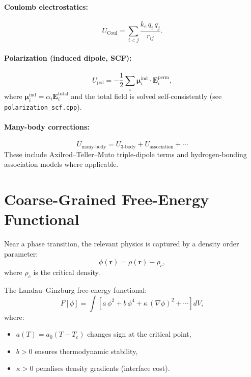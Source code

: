 \documentclass[11pt]{article}
\begin{document}
\paragraph{Coulomb electrostatics:}
\begin{equation}
  U_\mathrm{Coul} = \sum_{i<j} \frac{k_e\,q_i\,q_j}{r_{ij}}.
\end{equation}

\paragraph{Polarization (induced dipole, SCF):}
\begin{equation}
  U_\mathrm{pol} = -\frac{1}{2} \sum_i \boldsymbol{\mu}_i^\mathrm{ind}
    \cdot \mathbf{E}_i^\mathrm{perm},
\end{equation}
where $\boldsymbol{\mu}_i^\mathrm{ind} = \alpha_i \mathbf{E}_i^\mathrm{total}$
and the total field is solved self-consistently (see \texttt{polarization\_scf.cpp}).

\paragraph{Many-body corrections:}
\begin{equation}
  U_\mathrm{many\text{-}body} = U_\mathrm{3\text{-}body}
    + U_\mathrm{association} + \cdots
\end{equation}
These include Axilrod--Teller--Muto triple-dipole terms and
hydrogen-bonding association models where applicable.


\section{Coarse-Grained Free-Energy Functional}

Near a phase transition, the relevant physics is captured by a
density order parameter:
\begin{equation}
  \phi(\mathbf{r}) = \rho(\mathbf{r}) - \rho_c,
  \label{eq:order_parameter}
\end{equation}
where $\rho_c$ is the critical density.

The Landau--Ginzburg free-energy functional:
\begin{equation}
  F[\phi] = \int \left[
    a\,\phi^2 + b\,\phi^4 + \kappa\,(\nabla\phi)^2 + \cdots
  \right] dV,
  \label{eq:landau_ginzburg}
\end{equation}
where:
\begin{itemize}
  \item $a(T) = a_0(T - T_c)$ changes sign at the critical point,
  \item $b > 0$ ensures thermodynamic stability,
  \item $\kappa > 0$ penalises density gradients (interface cost).
\end{itemize}
\end{document}
